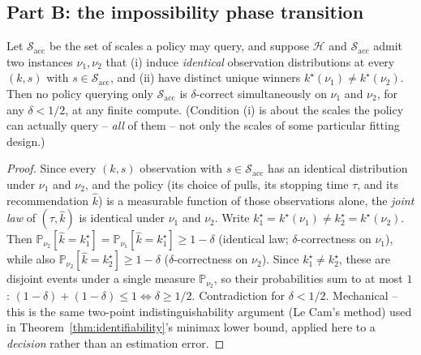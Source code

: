 \subsection{Part B: the impossibility phase transition}
\label{sec:theorem2-partb}

\begin{theorem}
\label{thm:impossibility}
Let $\mathcal{S}_{\mathrm{acc}}$ be the set of scales a policy may query, and suppose
$\mathcal{H}$ and $\mathcal{S}_{\mathrm{acc}}$ admit two instances $\nu_1, \nu_2$ that
(i) induce \emph{identical} observation distributions at every $(k, s)$ with $s \in
\mathcal{S}_{\mathrm{acc}}$, and (ii) have distinct unique winners
$k^\star(\nu_1) \ne k^\star(\nu_2)$. Then no policy querying only
$\mathcal{S}_{\mathrm{acc}}$ is $\delta$-correct simultaneously on $\nu_1$ and $\nu_2$,
for any $\delta < 1/2$, at any finite compute. (Condition (i) is about the scales the
policy can actually query -- \emph{all} of them -- not only the scales of some
particular fitting design.)
\end{theorem}

\begin{proof}
Since every $(k,s)$ observation with $s \in \mathcal{S}_{\mathrm{acc}}$ has an identical
distribution under $\nu_1$ and $\nu_2$, and the policy (its choice of pulls, its stopping time $\tau$, and
its recommendation $\hat{k}$) is a measurable function of those observations alone, the
\emph{joint law} of $(\tau, \hat{k})$ is identical under $\nu_1$ and $\nu_2$. Write
$k_1^\star = k^\star(\nu_1) \ne k_2^\star = k^\star(\nu_2)$. Then
$\mathbb{P}_{\nu_2}[\hat{k} = k_1^\star] = \mathbb{P}_{\nu_1}[\hat{k} = k_1^\star] \ge
1-\delta$ (identical law; $\delta$-correctness on $\nu_1$), while also
$\mathbb{P}_{\nu_2}[\hat{k} = k_2^\star] \ge 1-\delta$ ($\delta$-correctness on $\nu_2$).
Since $k_1^\star \ne k_2^\star$, these are disjoint events under a single measure
$\mathbb{P}_{\nu_2}$, so their probabilities sum to at most $1$:
$(1-\delta) + (1-\delta) \le 1 \iff \delta \ge 1/2$. Contradiction for $\delta < 1/2$.
Mechanical -- this is the same two-point indistinguishability argument (Le Cam's method)
used in Theorem~\ref{thm:identifiability}'s minimax lower bound, applied here to a
\emph{decision} rather than an estimation error.
\end{proof}

